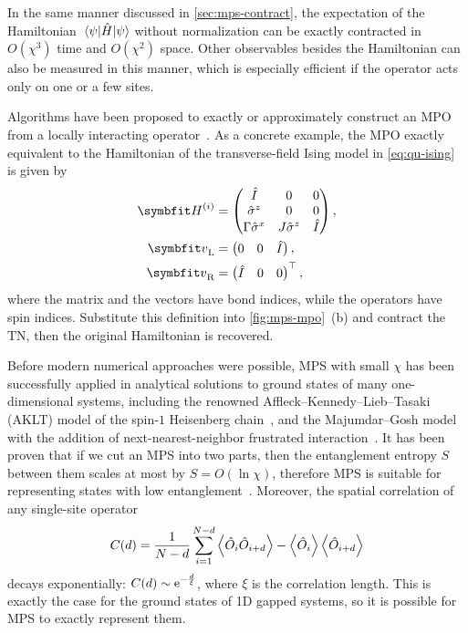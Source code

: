 In the same manner discussed in \cref{sec:mps-contract}, the expectation of the Hamiltonian $\mel{\psi}{\hat{H}}{\psi}$ without normalization can be exactly contracted in $O(\chi^3)$ time and $O(\chi^2)$ space. Other observables besides the Hamiltonian can also be measured in this manner, which is especially efficient if the operator acts only on one or a few sites.

Algorithms have been proposed to exactly or approximately construct an MPO from a locally interacting operator~\cite{crosswhite2008finite, hubig2017generic, paeckel2017automated}. As a concrete example, the MPO exactly equivalent to the Hamiltonian of the transverse-field Ising model in \cref{eq:qu-ising} is given by
\begin{align}
\mH^{(i)} &= \begin{pmatrix}
\hat{I} & 0 & 0 \\
\hat{\sigma}^z & 0 & 0 \\
\Gamma \hat{\sigma}^x & J \hat{\sigma}^z & \hat{I}
\end{pmatrix}, \\
\vv_\text{L} &= \begin{pmatrix} 0 & 0 & \hat{I} \end{pmatrix}, \\
\vv_\text{R} &= \begin{pmatrix} \hat{I} & 0 & 0 \end{pmatrix}^\transpose,
\end{align}
where the matrix and the vectors have bond indices, while the operators have spin indices. Substitute this definition into \cref{fig:mps-mpo}~(b) and contract the TN, then the original Hamiltonian is recovered.

Before modern numerical approaches were possible, MPS with small $\chi$ has been successfully applied in analytical solutions to ground states of many one-dimensional systems, including the renowned Affleck--Kennedy--Lieb--Tasaki (AKLT) model of the spin-$1$ Heisenberg chain~\cite{affleck1987rigorous, klumper1991equivalence, fannes1992finitely}, and the Majumdar--Gosh model with the addition of next-nearest-neighbor frustrated interaction~\cite{majumdar1969next}. It has been proven that if we cut an MPS into two parts, then the entanglement entropy $S$ between them scales at most by $S = O(\ln \chi)$, therefore MPS is suitable for representing states with low entanglement~\cite{verstraete2008matrix}. Moreover, the spatial correlation of any single-site operator
\begin{equation}
C(d) = \frac{1}{N - d} \sum_{i = 1}^{N - d} \ev{\hat{O}_i \hat{O}_{i + d}} - \ev{\hat{O}_i} \ev{\hat{O}_{i + d}}
\label{eq:corr-d}
\end{equation}
decays exponentially: $C(d) \sim \mathrm{e}^{-\frac{d}{\xi}}$, where $\xi$ is the correlation length. This is exactly the case for the ground states of 1D gapped systems, so it is possible for MPS to exactly represent them.

